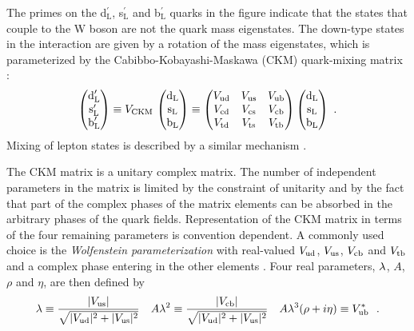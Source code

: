 The primes on the d$_\text{L}^\prime$, s$_\text{L}^\prime$ and b$_\text{L}^\prime$ quarks in the figure indicate that the states that
couple to the W boson are not the quark mass eigenstates. The down-type states in the interaction are given by a rotation of the mass
eigenstates, which is parameterized by the Cabibbo-Kobayashi-Maskawa (CKM) quark-mixing matrix \cite{Kobayashi:1973fv}:
\begin{equation}
  \begin{pmatrix} \text{d}_\text{L}^\prime \\ \text{s}_\text{L}^\prime \\ \text{b}_\text{L}^\prime \end{pmatrix}
    \equiv V_\text{CKM}\, \begin{pmatrix} \text{d}_\text{L} \\ \text{s}_\text{L} \\ \text{b}_\text{L} \end{pmatrix}
    \equiv \begin{pmatrix} V_\text{ud} & V_\text{us} & V_\text{ub} \\ V_\text{cd} & V_\text{cs} & V_\text{cb} \\ V_\text{td} & V_\text{ts} & V_\text{tb} \end{pmatrix}
           \begin{pmatrix} \text{d}_\text{L} \\ \text{s}_\text{L} \\ \text{b}_\text{L} \end{pmatrix}
    \ .
\end{equation}
Mixing of lepton states is described by a similar mechanism \cite{Pontecorvo:1957cp,*Pontecorvo:1957qd,*Maki:1962mu,*Pontecorvo:1967fh}.

The CKM matrix is a unitary complex matrix. The number of independent parameters in the matrix is limited by the constraint of unitarity
and by the fact that part of the complex phases of the matrix elements can be absorbed in the arbitrary phases of the quark fields.
Representation of the CKM matrix in terms of the four remaining parameters is convention dependent. A commonly used choice is the
\emph{Wolfenstein parameterization} with real-valued $V_\text{ud}$, $V_\text{us}$, $V_\text{cb}$ and $V_\text{tb}$ and a complex phase entering in the other elements
\cite{Wolfenstein:1983yz,*Chau:1984fp,*Buras:1994ec}. Four real parameters, $\lambda$, $A$, $\rho$ and $\eta$, are then
defined by
\begin{equation}
  \begin{gathered}
    \lambda \equiv \frac{|V_\text{us}|}{\sqrt{|V_\text{ud}|^2 + |V_\text{us}|^2}}
      \quad
      A\lambda^2 \equiv \frac{|V_\text{cb}|}{\sqrt{|V_\text{ud}|^2 + |V_\text{us}|^2}}
      \quad
      A\lambda^3(\rho+i\eta) \equiv V_\text{ub}^*
      \ \ .
  \end{gathered}
\end{equation}

